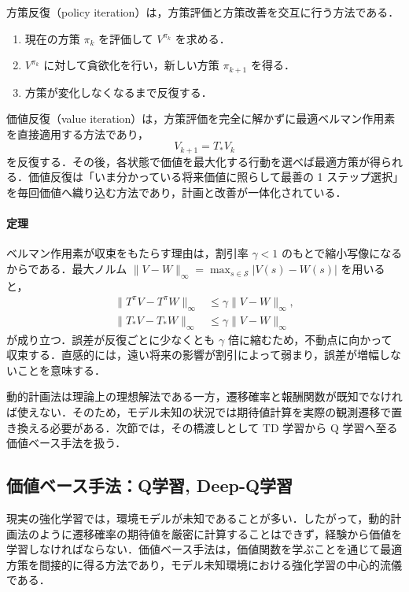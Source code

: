 方策反復（policy iteration）は，方策評価と方策改善を交互に行う方法である．
\begin{enumerate}
\item 現在の方策 $\pi_k$ を評価して $V^{\pi_k}$ を求める．
\item $V^{\pi_k}$ に対して貪欲化を行い，新しい方策 $\pi_{k+1}$ を得る．
\item 方策が変化しなくなるまで反復する．
\end{enumerate}

価値反復（value iteration）は，方策評価を完全に解かずに最適ベルマン作用素を直接適用する方法であり，
\begin{equation}
V_{k+1} = T_\ast V_k
\end{equation}
を反復する．その後，各状態で価値を最大化する行動を選べば最適方策が得られる．価値反復は「いま分かっている将来価値に照らして最善の 1 ステップ選択」を毎回価値へ織り込む方法であり，計画と改善が一体化されている．

\paragraph*{定理}
ベルマン作用素が収束をもたらす理由は，割引率 $\gamma < 1$ のもとで縮小写像になるからである．最大ノルム $\|V-W\|_\infty = \max_{s \in \mathcal{S}} |V(s)-W(s)|$ を用いると，
\begin{align}
\|T^\pi V - T^\pi W\|_\infty &\le \gamma \|V-W\|_\infty, \\
\|T_\ast V - T_\ast W\|_\infty &\le \gamma \|V-W\|_\infty
\end{align}
が成り立つ．誤差が反復ごとに少なくとも $\gamma$ 倍に縮むため，不動点に向かって収束する．直感的には，遠い将来の影響が割引によって弱まり，誤差が増幅しないことを意味する．

動的計画法は理論上の理想解法である一方，遷移確率と報酬関数が既知でなければ使えない．そのため，モデル未知の状況では期待値計算を実際の観測遷移で置き換える必要がある．次節では，その橋渡しとして TD 学習から Q 学習へ至る価値ベース手法を扱う．

\subsection{価値ベース手法：Q学習, Deep-Q学習}

現実の強化学習では，環境モデルが未知であることが多い．したがって，動的計画法のように遷移確率の期待値を厳密に計算することはできず，経験から価値を学習しなければならない．価値ベース手法は，価値関数を学ぶことを通じて最適方策を間接的に得る方法であり，モデル未知環境における強化学習の中心的流儀である．


